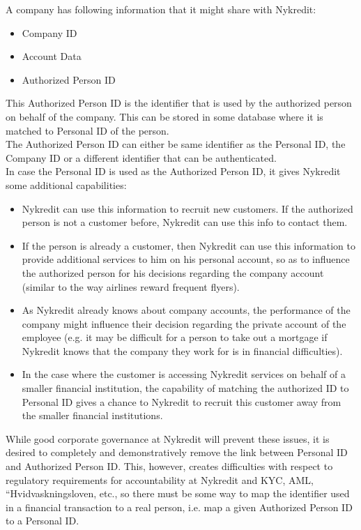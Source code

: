 A company has following information that it might share with Nykredit:
\begin{itemize}
	\item Company ID	
	\item Account Data
	\item Authorized Person ID
\end{itemize}
This Authorized Person ID is the identifier that is used by the authorized person on behalf of the company. This can be stored in some database where it is matched to Personal ID of the person.
\\The Authorized Person ID can either be same identifier as the Personal ID, the Company ID or a different identifier that can be authenticated. 
\\In case the Personal ID is used as the Authorized Person ID, it gives Nykredit some additional capabilities:
\begin{itemize}
\item Nykredit can use this information to recruit new customers. If the authorized person is not a customer before, Nykredit can use this info to contact them.
\item If the person is already a customer, then Nykredit can use this information to provide additional services to him on his personal account, so as to influence the authorized person for his decisions regarding the company account (similar to the way airlines reward frequent flyers).
\item As Nykredit already knows about company accounts, the performance of the company might influence their decision regarding the private account of the employee (e.g. it may be difficult for a person to take out a mortgage if Nykredit knows that the company they work for is in financial difficulties).
\item In the case where the customer is accessing Nykredit services on behalf of a smaller financial institution, the capability of matching the authorized ID to Personal ID gives a chance to Nykredit to recruit this customer away from the smaller financial institutions.
\end{itemize}
While good corporate governance at Nykredit will prevent these issues, it is desired to completely and demonstratively remove the link between Personal ID and Authorized Person ID. This, however, creates difficulties with respect to regulatory requirements for accountability at Nykredit and KYC, AML, “Hvidvaskningsloven, etc., so there must be some way to map the identifier used in a financial transaction to a real person, i.e. map a given Authorized Person ID to a Personal ID.

